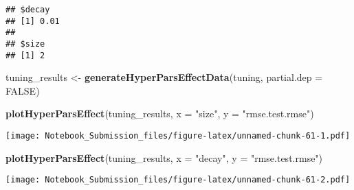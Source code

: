 \documentclass[
]{article}
\newenvironment{Shaded}{\begin{snugshade}}{\end{snugshade}}
\newcommand{\DataTypeTok}[1]{\textcolor[rgb]{0.13,0.29,0.53}{#1}}
\newcommand{\KeywordTok}[1]{\textcolor[rgb]{0.13,0.29,0.53}{\textbf{#1}}}
\newcommand{\NormalTok}[1]{#1}
\newcommand{\OperatorTok}[1]{\textcolor[rgb]{0.81,0.36,0.00}{\textbf{#1}}}
\newcommand{\OtherTok}[1]{\textcolor[rgb]{0.56,0.35,0.01}{#1}}
\newcommand{\StringTok}[1]{\textcolor[rgb]{0.31,0.60,0.02}{#1}}
\begin{document}
\begin{verbatim}
## $decay
## [1] 0.01
## 
## $size
## [1] 2
\end{verbatim}

\begin{Shaded}
\begin{Highlighting}[]
\NormalTok{tuning_results <-}\StringTok{ }\KeywordTok{generateHyperParsEffectData}\NormalTok{(tuning, }\DataTypeTok{partial.dep =} \OtherTok{FALSE}\NormalTok{)}

\KeywordTok{plotHyperParsEffect}\NormalTok{(tuning_results, }\DataTypeTok{x =} \StringTok{"size"}\NormalTok{, }\DataTypeTok{y =} \StringTok{"rmse.test.rmse"}\NormalTok{)}
\end{Highlighting}
\end{Shaded}

\texttt{[image: Notebook\_Submission\_files/figure-latex/unnamed-chunk-61-1.pdf]}

\begin{Shaded}
\begin{Highlighting}[]
\KeywordTok{plotHyperParsEffect}\NormalTok{(tuning_results, }\DataTypeTok{x =} \StringTok{"decay"}\NormalTok{, }\DataTypeTok{y =} \StringTok{"rmse.test.rmse"}\NormalTok{)}
\end{Highlighting}
\end{Shaded}

\texttt{[image: Notebook\_Submission\_files/figure-latex/unnamed-chunk-61-2.pdf]}

\begin{Shaded}
\end{Shaded}
\end{document}
